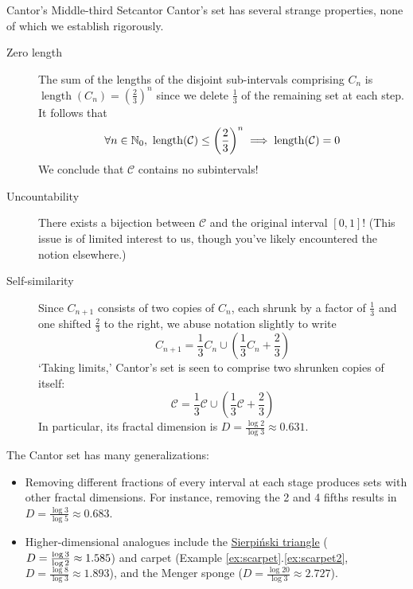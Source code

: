 \begin{example}{Cantor's Middle-third Set}{cantor}
	Cantor's set has several strange properties, none of which we establish rigorously.
	\begin{description}
	  \item[Zero length] The sum of the lengths of the disjoint sub-intervals comprising $C_n$ is $\operatorname{length}(C_n)=\left(\frac 23\right)^n$	since we delete $\frac 13$ of the remaining set at each step. It follows that
	  \[
	  	\forall n\in\mathbb{N}_0,\ \operatorname{length}(\mathcal C)\le \left(\frac 23\right)^n \implies \operatorname{length}(\mathcal C)=0
	  \]
	  We conclude that $\mathcal C$ contains no subintervals!
	  \item[Uncountability] There exists a bijection between $\mathcal C$ and the original interval $[0,1]$! (This issue is of limited interest to us, though you've likely encountered the notion elsewhere.)
	  \item[Self-similarity] Since $C_{n+1}$ consists of two copies of $C_n$, each shrunk by a factor of $\frac 13$ and one shifted $\frac 23$ to the right, we abuse notation slightly to write
		\[
			C_{n+1}=\frac 13C_n\cup\left(\frac 13C_n+\frac 23\right)
		\]
		`Taking limits,' Cantor's set is seen to comprise two shrunken copies of itself:
		\[
			\mathcal C=\frac 13\mathcal C\cup\left(\frac 13\mathcal C+\frac 23\right)
		\]
		In particular, its fractal dimension is $D=\frac{\log 2}{\log 3}\approx 0.631$.
	\end{description}

	The Cantor set has many generalizations:
	\begin{itemize}\itemsep0pt
	  \item Removing different fractions of every interval at each stage produces sets with other fractal dimensions. For instance, removing the 2\nd{} and 4\th{} fifths results in $D=\frac{\log 3}{\log 5}\approx 0.683$.
	  \item Higher-dimensional analogues include the \href{https://en.wikipedia.org/wiki/Sierpiński_triangle}{Sierpiński triangle} ($D=\smash{\frac{\log 3}{\log 2}}\approx 1.585$) and carpet (Example \ref*{ex:scarpet}.\ref{ex:scarpet2}, $D=\frac{\log 8}{\log 3}\approx 1.893$), and the Menger sponge ($D=\frac{\log 20}{\log 3}\approx 2.727$).
	\end{itemize}
\end{example}
\vspace{-5pt}


